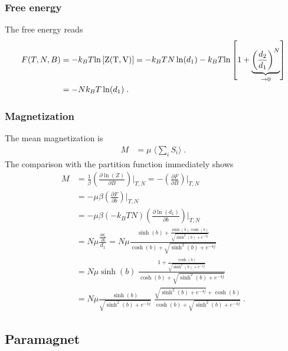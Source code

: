 \subsubsection{Free energy}
The free energy reads
%
\begin{align*}
F(T,N,B) &= -k_{B}T {\rm ln\left[Z(T,V)\right]} = -k_{B}T N \ln(d_{1}) -k_{B} T 
{\rm ln\left[1+\underbrace{\bigg(
\frac{d_{2}}{d_{1}}
\bigg)^{N}}_{\to 0}\right]} \\
&= - N k_{B}T\ln(d_{1})\;.
\end{align*}
%
\subsubsection{Magnetization}

The mean magnetization is
%
\begin{align*}
M &= \mu \; \langle\sum_{i} S_{i}\rangle\;.
\end{align*}
% 
The comparison with the partition function immediately shows
%
\begin{align*}
M &=  \frac{1}{\beta} \left(\frac{\partial \ln(Z)}{\partial  B}\right)\bigg|_{T,N } = -
 \left(\frac{\partial F}{\partial  B}\right)\bigg|_{T,N } \\
 &= - \mu \beta \left(\frac{\partial F}{\partial  b}\right)\bigg|_{T,N } \\
 &= - \mu \beta (-k_{B} T N) \left(\frac{\partial \ln(d_{1})}{\partial  b}\right)\bigg|_{T,N } \\
 &= N \mu  \frac{\frac{\partial d_{1}}{\partial  b}}{d_{1}} 
 =N \mu \frac{\sinh(b) + \frac{\sinh(b) \cosh(b)}{\sqrt{\sinh^{2}(b)+e^{-4j}}}}{\cosh(b) + \sqrt{\sinh^{2}(b)+e^{-4j} }}\\
 &=N\mu \sinh(b)\;\frac{1 + \frac{\cosh(b)}{\sqrt{\sinh^{2}(b)+e^{-4j}}}}{\cosh(b) + \sqrt{\sinh^{2}(b)+e^{-4j} }}\\
 &=N \mu\frac{\sinh(b)}{\sqrt{\sinh^{2}(b)+e^{-4j}}}\;\frac{\sqrt{\sinh^{2}(b)+e^{-4j}} + \cosh(b)}{\cosh(b) + \sqrt{\sinh^{2}(b)+e^{-4j} }}\;.
\end{align*}
%
%


\subsection{Paramagnet}

